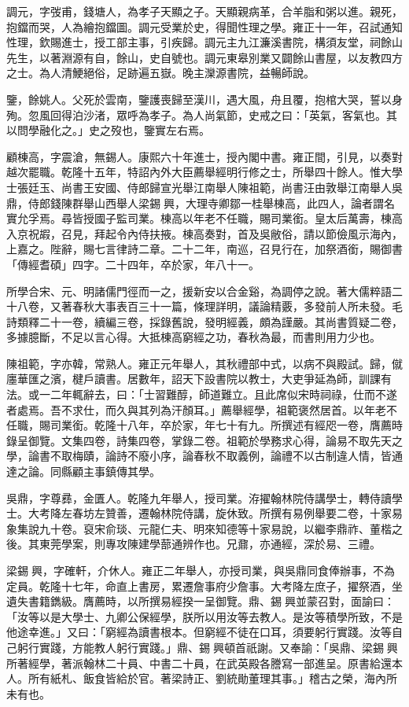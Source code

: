 \begin{pinyinscope}
調元，字弢甫，錢塘人，為孝子天顯之子。天顯親病革，合羊脂和粥以進。親死，抱鐺而哭，人為繪抱鐺圖。調元受業於史，得聞性理之學。雍正十一年，召試通知性理，欽賜進士，授工部主事，引疾歸。調元主九江濂溪書院，構須友堂，祠餘山先生，以著淵源有自，餘山，史自號也。調元東皋別業又闢餘山書屋，以友教四方之士。為人清鯁絕俗，足跡遍五嶽。晚主灤源書院，益暢師說。

鑒，餘姚人。父死於雲南，鑒護喪歸至漢川，遇大風，舟且覆，抱棺大哭，誓以身殉。忽風回得泊沙渚，眾呼為孝子。為人尚氣節，史戒之曰：「英氣，客氣也。其以問學融化之。」史之歿也，鑒實左右焉。

顧棟高，字震滄，無錫人。康熙六十年進士，授內閣中書。雍正間，引見，以奏對越次罷職。乾隆十五年，特詔內外大臣薦舉經明行修之士，所舉四十餘人。惟大學士張廷玉、尚書王安國、侍郎歸宣光舉江南舉人陳祖範，尚書汪由敦舉江南舉人吳鼎，侍郎錢陳群舉山西舉人梁錫興，大理寺卿鄒一桂舉棟高，此四人，論者謂名實允孚焉。尋皆授國子監司業。棟高以年老不任職，賜司業銜。皇太后萬壽，棟高入京祝嘏，召見，拜起令內侍扶掖。棟高奏對，首及吳敝俗，請以節儉風示海內，上嘉之。陛辭，賜七言律詩二章。二十二年，南巡，召見行在，加祭酒銜，賜御書「傳經耆碩」四字。二十四年，卒於家，年八十一。

所學合宋、元、明諸儒門徑而一之，援新安以合金谿，為調停之說。著大儒粹語二十八卷，又著春秋大事表百三十一篇，條理詳明，議論精覈，多發前人所未發。毛詩類釋二十一卷，續編三卷，採錄舊說，發明經義，頗為謹嚴。其尚書質疑二卷，多據臆斷，不足以言心得。大抵棟高窮經之功，春秋為最，而書則用力少也。

陳祖範，字亦韓，常熟人。雍正元年舉人，其秋禮部中式，以病不與殿試。歸，僦廛華匯之濱，楗戶讀書。居數年，詔天下設書院以教士，大吏爭延為師，訓課有法。或一二年輒辭去，曰：「士習難醇，師道難立。且此席似宋時祠祿，仕而不遂者處焉。吾不求仕，而久與其列為汗顏耳。」薦舉經學，祖範褒然居首。以年老不任職，賜司業銜。乾隆十八年，卒於家，年七十有九。所撰述有經咫一卷，膺薦時錄呈御覽。文集四卷，詩集四卷，掌錄二卷。祖範於學務求心得，論易不取先天之學，論書不取梅賾，論詩不廢小序，論春秋不取義例，論禮不以古制違人情，皆通達之論。同縣顧主事鎮傳其學。

吳鼎，字尊彞，金匱人。乾隆九年舉人，授司業。洊擢翰林院侍講學士，轉侍讀學士。大考降左春坊左贊善，遷翰林院侍講，旋休致。所撰有易例舉要二卷，十家易象集說九十卷。裒宋俞琰、元龍仁夫、明來知德等十家易說，以繼李鼎祚、董楷之後。其東莞學案，則專攻陳建學蔀通辨作也。兄鼐，亦通經，深於易、三禮。

梁錫興，字確軒，介休人。雍正二年舉人，亦授司業，與吳鼎同食俸辦事，不為定員。乾隆十七年，命直上書房，累遷詹事府少詹事。大考降左庶子，擢祭酒，坐遺失書籍鐫級。膺薦時，以所撰易經揆一呈御覽。鼎、錫興並蒙召對，面諭曰：「汝等以是大學士、九卿公保經學，朕所以用汝等去教人。是汝等積學所致，不是他途幸進。」又曰：「窮經為讀書根本。但窮經不徒在口耳，須要躬行實踐。汝等自己躬行實踐，方能教人躬行實踐。」鼎、錫興頓首祇謝。又奉諭：「吳鼎、梁錫興所著經學，著派翰林二十員、中書二十員，在武英殿各謄寫一部進呈。原書給還本人。所有紙札、飯食皆給於官。著梁詩正、劉統勛董理其事。」稽古之榮，海內所未有也。


\end{pinyinscope}
